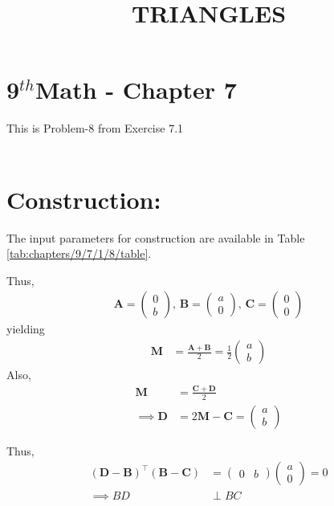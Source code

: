 \documentclass[10pt]{article}
\providecommand{\brak}[1]{\ensuremath{\left(#1\right)}}
\newcommand{\solution}{\noindent \textbf{Solution: }}
\newcommand{\myvec}[1]{\ensuremath{\begin{pmatrix}#1\end{pmatrix}}}
\let\vec\mathbf{}
\begin{document}
\begin{center}
\title{\textbf{TRIANGLES}}
\date{\vspace{-5ex}}
\maketitle
\end{center}
\section*{9$^{th}$Math - Chapter 7}
This is Problem-8 from Exercise 7.1\\\\


\section*{\large Construction:}
\fi
The input parameters for construction
	are available in Table \ref{tab:chapters/9/7/1/8/table}.
\begin{table}[h!]
	\centering
     
	\caption{}
	\label{tab:chapters/9/7/1/8/table}
\end{table}
Thus, 
\begin{align}
	\vec{A}=\myvec{0\\b},\,
	\vec{B}=\myvec{a\\0},\,
	\vec{C}=\myvec{0\\0}
\end{align}
yielding
\begin{align}
	\vec{M}&=\frac{\vec{A}+\vec{B}}{2}=\frac{1}{2}\myvec{a\\b}
\end{align}
Also, 
\begin{align}
	\vec{M}&=\frac{\vec{C}+\vec{D}}{2}\\
	\implies \vec{D}&=2\vec{M}-\vec{C}=\myvec{a\\b}
\end{align}
\iffalse
\solution
Given
\begin{align}
	\vec{M}&=\frac{\vec{A}+\vec{B}}{2}
	\label{eq:chapters/9/7/1/8/1}\\
	\vec{D}-\vec{M}&=\vec{C}-\vec{M}
	\label{eq:chapters/9/7/1/8/2}\\
	\angle ACB&=90\degree
\end{align}
\textbf{Proof:} From Figure \ref{fig:chapters/9/7/1/8/1}
\fi
Thus,
\begin{align}
	\brak{\vec{D}-\vec{B}}^{\top}\brak{\vec{B}-\vec{C}} &= \myvec{0 & b}\myvec{a\\0}=0\\
	\implies BD & \perp BC\\
\end{align}
\end{document}
